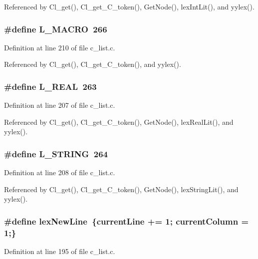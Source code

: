 Referenced by Cl\_\-get(), Cl\_\-get\_\-C\_\-token(), Get\-Node(), lex\-Int\-Lit(), and yylex().
\subsubsection{\setlength{\rightskip}{0pt plus 5cm}\#define L\_\-MACRO~266}\label{c__list_8c_d72cf38a4b04d7969a2c4103174ed270}




Definition at line 210 of file c\_\-list.c.

Referenced by Cl\_\-get(), Cl\_\-get\_\-C\_\-token(), and yylex().
\subsubsection{\setlength{\rightskip}{0pt plus 5cm}\#define L\_\-REAL~263}\label{c__list_8c_43900453a8567ae12822287b7be1a93d}




Definition at line 207 of file c\_\-list.c.

Referenced by Cl\_\-get(), Cl\_\-get\_\-C\_\-token(), Get\-Node(), lex\-Real\-Lit(), and yylex().
\subsubsection{\setlength{\rightskip}{0pt plus 5cm}\#define L\_\-STRING~264}\label{c__list_8c_7fac69c283299c1ef115e1246a3e5d19}




Definition at line 208 of file c\_\-list.c.

Referenced by Cl\_\-get(), Cl\_\-get\_\-C\_\-token(), Get\-Node(), lex\-String\-Lit(), and yylex().
\subsubsection{\setlength{\rightskip}{0pt plus 5cm}\#define lex\-New\-Line~\{\bf{current\-Line} += 1; \bf{current\-Column} = 1;\}}\label{c__list_8c_2710fde57562ac3ffce63ddd1fb214e9}




Definition at line 195 of file c\_\-list.c.

